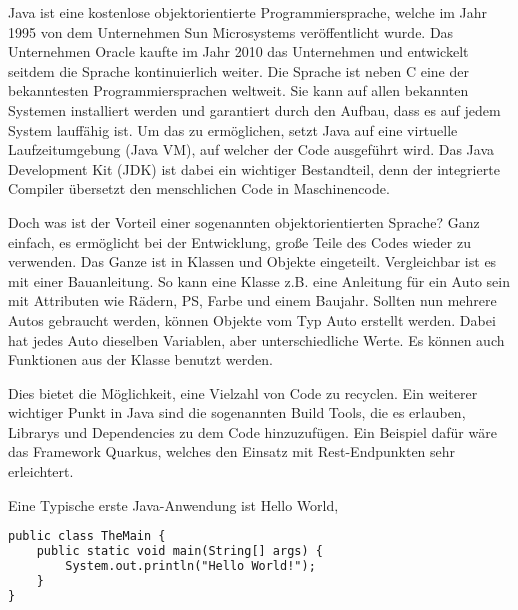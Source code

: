 Java ist eine kostenlose objektorientierte Programmiersprache, welche im Jahr 1995 von dem Unternehmen Sun Microsystems veröffentlicht wurde. Das Unternehmen Oracle kaufte im Jahr 2010 das Unternehmen und entwickelt seitdem die Sprache kontinuierlich weiter. Die Sprache ist neben C eine der bekanntesten Programmiersprachen weltweit. Sie kann auf allen bekannten Systemen installiert werden und garantiert durch den Aufbau, dass es auf jedem System lauffähig ist. Um das zu ermöglichen, setzt Java auf eine virtuelle Laufzeitumgebung (Java VM), auf welcher der Code ausgeführt wird. Das Java Development Kit (JDK) ist dabei ein wichtiger Bestandteil, denn der integrierte Compiler übersetzt den menschlichen Code in Maschinencode. 

Doch was ist der Vorteil einer sogenannten objektorientierten Sprache? Ganz einfach, es ermöglicht bei der Entwicklung, große Teile des Codes wieder zu verwenden. Das Ganze ist in Klassen und Objekte eingeteilt. Vergleichbar ist es mit einer Bauanleitung. So kann eine Klasse z.B. eine Anleitung für ein Auto sein mit Attributen wie Rädern, PS, Farbe und einem Baujahr. Sollten nun mehrere Autos gebraucht werden, können Objekte vom Typ Auto erstellt werden. Dabei hat jedes Auto dieselben Variablen, aber unterschiedliche Werte. Es können auch Funktionen aus der Klasse benutzt werden.  

Dies bietet die Möglichkeit, eine Vielzahl von Code zu recyclen. Ein weiterer wichtiger Punkt in Java sind die sogenannten Build Tools, die es erlauben, Librarys und Dependencies zu dem Code hinzuzufügen. Ein Beispiel dafür wäre das Framework Quarkus, welches den Einsatz mit Rest-Endpunkten sehr erleichtert.   

Eine Typische erste Java-Anwendung ist Hello World,

\begin{lstlisting}[language=HTML,caption=Hello World,label=lst:impl:HelloWorld]
    public class TheMain {
    public static void main(String[] args) {
        System.out.println("Hello World!");
    }
}
  \end{lstlisting}